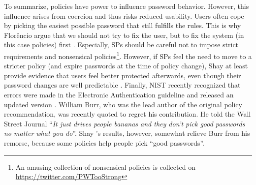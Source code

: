 	To summarize, policies have power to influence password behavior. However, this influence arises from coercion and thus risks reduced usability. Users often cope by picking the easiest possible password that still fulfills the rules. This is why Florêncio \etal argue that we should not try to fix the user, but to fix the system (in this case policies) first \cite{Florencio2014AdministratorsGuide}. Especially, \glspl{SP} should be careful not to impose strict requirements and nonsensical policies\footnote{An amusing collection of nonsensical policies is collected on \url{https://twitter.com/PWTooStrong} }. However, if \glspl{SP} feel the need to move to a stricter policy (and expire passwords at the time of policy change), Shay \etal at least provide evidence that users feel better protected afterwards, even though their password changes are well predictable \cite{Shay2010EncounteringPasswordRequirements}. Finally, \gls{NIST} recently recognized that errors were made in the Electronic Authentication guideline and released an updated version \ar. William Burr, who was the lead author of the original policy recommendation, was recently quoted to regret his contribution. He told the Wall Street Journal ``\textit{It just drives people bananas and they don’t pick good passwords no matter what you do}''. Shay \etal's results, however, somewhat relieve Burr from his remorse, because some policies help people pick ``good passwords''.
	
	
